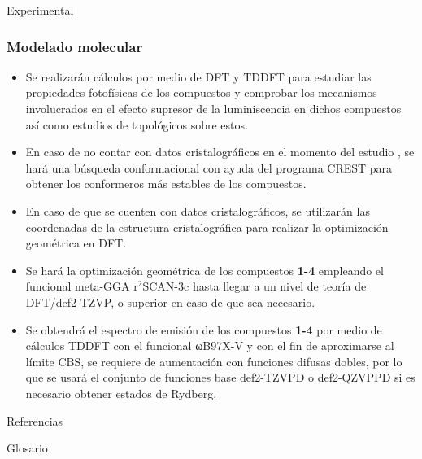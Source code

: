 \documentclass[%
spanish,
mexico]{beamer}
\newcommand\scan{\(\text{r}^{2}\text{SCAN-3c}\)}
\begin{document}
\begin{frame}{Experimental}
    \subsubsection{Modelado molecular}
    \begin{itemize}[<+- | alert@+>]
        \item Se realizarán cálculos \insilico{} por medio de \gls{DFT} y \gls{TDDFT} para estudiar las propiedades fotofísicas de los compuestos y comprobar los mecanismos involucrados en el efecto supresor de la luminiscencia en dichos compuestos así como estudios de topológicos sobre estos.
        \item En caso de no contar con datos cristalográficos en el momento del estudio \insilico{}, se hará una búsqueda conformacional con ayuda del programa \gls{CREST} \cite{prachtAutomatedExplorationLowenergy2020} para obtener los conformeros más estables de los compuestos.
        \item En caso de que se cuenten con datos cristalográficos, se utilizarán las coordenadas de la estructura cristalográfica para realizar la optimización geométrica en DFT.
        \item Se hará la optimización geométrica de los compuestos \textbf{1-4} empleando el funcional meta-GGA \scan{} \cite{gasevicOptimizationSCAN3cComposite2022} hasta llegar a un nivel de teoría de DFT/def2-TZVP, o superior en caso de que sea necesario.
        \item Se obtendrá el espectro de emisión de los compuestos \textbf{1-4} por medio de cálculos \gls{TDDFT} con el funcional ωB97X-V y con el fin de aproximarse al límite CBS, se requiere de aumentación con funciones difusas dobles, por lo que se usará el conjunto de funciones base def2-TZVPD o def2-QZVPPD si es necesario obtener estados de Rydberg.
    \end{itemize}
\end{frame}

\begin{frame}[allowframebreaks]{Referencias}
	\small
	\printbibliography{}
\end{frame}

\begin{frame}[allowframebreaks]{Glosario}
	\small
	\printglossary[type=main,style=long,nonumberlist]
\end{frame}
\end{document}
